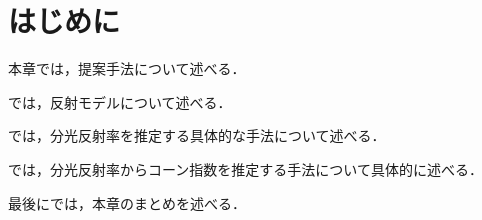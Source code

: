 \documentclass[../main]{subfiles}
\begin{document}
\graphicspath{{../figures/chap3/}}

\section{はじめに}
\label{sec:pmethod_introduction}

本章では，提案手法について述べる．

では，反射モデルについて述べる．

では，分光反射率を推定する具体的な手法について述べる．

では，分光反射率からコーン指数を推定する手法について具体的に述べる．

最後にでは，本章のまとめを述べる．
\end{document}
